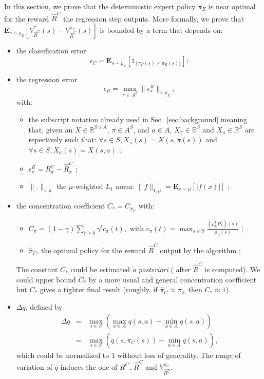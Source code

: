 \documentclass[smallextended]{svjour3}
\newcommand{\E}{\mathbf{E}}
\begin{document}
In this section, we prove that the deterministic expert policy $\pi_E$ is near optimal for the reward $\hat{R}^C$ the regression step outputs.
More formally, we prove that $\E_{s\sim\rho_E}[V^*_{\hat{R}^C}(s)-V^{\pi_E}_{\hat{R}^C}(s)]$ is bounded by a term that depends on:
\begin{itemize}
  \item the classification error
\begin{equation}  
\epsilon_C=\E_{s\sim\rho_E}[\mathds{1}_{\{\pi_C(s)\neq\pi_E(s)\}}];
\end{equation}
\item the regression error
  \begin{equation}
    \epsilon_R=\max_{\pi\in A^S}\|\epsilon_\pi^R\|_{1,\rho_E},
  \end{equation}
  with:
  \begin{itemize}
  \item the subscript notation already used in Sec.~\ref{sec:background} meaning that, given an $X\in\mathbb{R}^{S\times A}$, $\pi\in A^S$, and $a\in A$,  $X_\pi\in\mathbb{R}^S$ and $X_a\in\mathbb{R}^S$ are repectively such that: $\forall s\in S, X_\pi(s)=X(s,\pi(s))$ and $\forall s\in S, X_a(s)=X(s,a)$ ;
  \item $\epsilon^R_\pi=R^C_\pi-\hat{R}^C_\pi$ ;
  \item $\|.\|_{1,\mu}$ the $\mu$-weighted $L_1$ norm: $\|f\|_{1,\mu} = \E_{x\sim \mu}[|f(x)|]$ ;
  \end{itemize}
\item the concentration coefficient $C_* = C_{\hat \pi_C}$ with:
  \begin{itemize}
  \item $C_{\pi}=(1-\gamma)\sum_{t\geq0}\gamma^tc_{\pi}(t), \text{ with } c_{\pi}(t)=\max_{s\in S}\frac{(\rho_E^TP^t_\pi)(s)}{\rho_E(s)}$ ;
  \item $\hat \pi_C$, the optimal policy for the reward $\hat R^C$ output by the algorithm ;
  \end{itemize}
  The constant $C_*$ could be estimated \emph{a posteriori} ( after $\hat{R}^C$ is computed). We could upper bound $C_*$ by a more usual and general concentration coefficient but $C_*$ gives a tighter final result (roughly, if $\hat{\pi}_C\approx\pi_E$ then $C_* \approx 1$).
\item $\Delta q$, defined by 
  \begin{eqnarray}
    \Delta q &= &\max_{s\in S}(\max_{a\in A}q(s,a)-\min_{a\in A}q(s,a))\\
    &=&\max_{s\in S}(q(s,\pi_C(s))-\min_{a\in A}q(s,a)),
    \end{eqnarray} which could be normalized to $1$ without loss of generality. The range of variation of $q$ induces the one of $R^C$, $\hat{R}^C$ and $V^{\pi_C}_{\hat{R^C}}$.
  \end{itemize}
\end{document}
